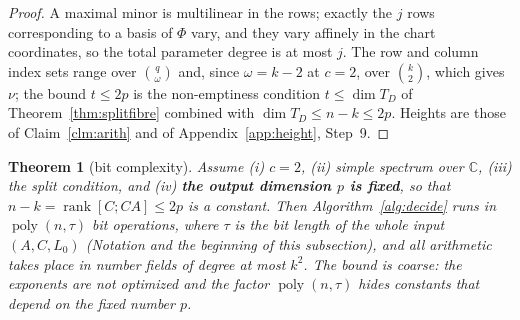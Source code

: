 \documentclass[journal]{IEEEtran}
\theoremstyle{plainn}
\newtheorem{thm}{Theorem}
\theoremstyle{remark}
\newcommand{\rank}{\operatorname{rank}}
\newcommand{\poly}{\operatorname{poly}}
\begin{document}
\begin{proof}
A maximal minor is multilinear in the rows; exactly the $j$ rows corresponding to a basis of $\Phi$ vary,
and they vary affinely in the chart coordinates, so the total parameter degree is at most $j$. The row and
column index sets range over $\binom{q}{\omega}$ and, since $\omega=k-2$ at $c=2$, over $\binom{k}{2}$,
which gives $\nu$; the bound $t\le2p$ is the non-emptiness condition $t\le\dim T_D$ of
Theorem~\ref{thm:splitfibre} combined with $\dim T_D\le n-k\le2p$. Heights are those of
Claim~\ref{clm:arith} and of Appendix~\ref{app:height}, Step~9.
\end{proof}

\begin{thm}[bit complexity]\label{thm:complexity}
Assume (i) $c=2$, (ii) simple spectrum over $\mathbb C$, (iii) the split condition, and (iv) \textbf{the
output dimension $p$ is fixed}, so that $n-k=\rank[C;CA]\le2p$ is a constant. Then
Algorithm~\ref{alg:decide} runs in
$\poly(n,\tau)$ bit operations, where $\tau$ is the bit length of the whole input $(A,C,L_0)$
(Notation and the beginning of this subsection), and all arithmetic takes place in number fields of degree
at most $k^2$. The bound is coarse: the exponents are not optimized and the factor $\poly(n,\tau)$ hides
constants that depend on the fixed number $p$.
\end{thm}
\end{document}
